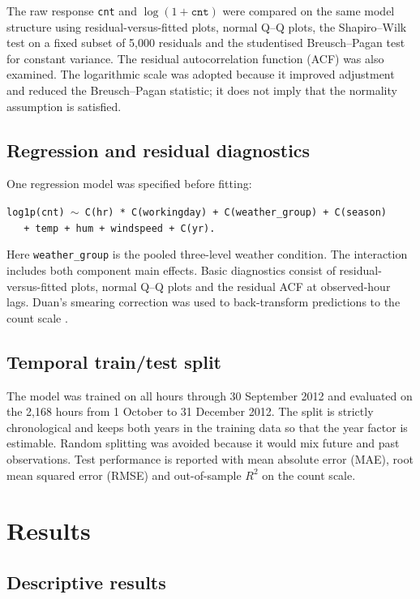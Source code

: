 \documentclass[12pt]{article}
\begin{document}
The raw response \texttt{cnt} and $\log(1+\texttt{cnt})$ were compared on the
same model structure using residual-versus-fitted plots, normal Q--Q plots, the
Shapiro--Wilk test on a fixed subset of 5,000 residuals and the studentised
Breusch--Pagan test for constant variance. The residual autocorrelation function
(ACF) was also examined. The logarithmic scale was adopted because it improved
adjustment and reduced the Breusch--Pagan statistic; it does not imply that the
normality assumption is satisfied.

\subsection{Regression and residual diagnostics}

One regression model was specified before fitting:
\begin{center}
\texttt{log1p(cnt) $\sim$ C(hr) * C(workingday) + C(weather\_group) + C(season)} \\
\texttt{$\quad$ + temp + hum + windspeed + C(yr).}
\end{center}
Here \texttt{weather\_group} is the pooled three-level weather condition. The
interaction includes both component main effects. Basic diagnostics consist
of residual-versus-fitted plots, normal Q--Q plots and the residual ACF at
observed-hour lags. Duan's smearing correction was used to back-transform
predictions to the count scale \cite{duan1983}.

\subsection{Temporal train/test split}

The model was trained on all hours through 30 September 2012 and evaluated on
the 2,168 hours from 1 October to 31 December 2012. The split is strictly
chronological and keeps both years in the training data so that the year factor
is estimable. Random splitting was avoided because it would mix future and past
observations. Test performance is reported with mean absolute error (MAE), root
mean squared error (RMSE) and out-of-sample $R^2$ on the count scale.

\section{Results}

\subsection{Descriptive results}
\end{document}
